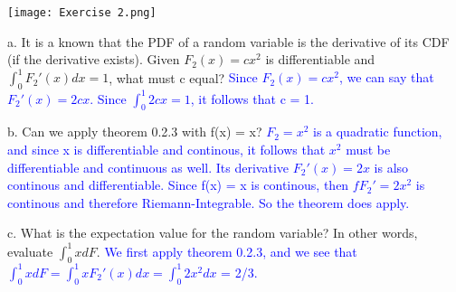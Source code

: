 \documentclass{report}
\begin{document}
\begin{center}
    \texttt{[image: Exercise 2.png]}
\end{center}
a. It is a known that the PDF of a random variable
is the derivative of its CDF (if the derivative exists). Given $F_2(x) = cx^2$ is differentiable 
and $\int_{0}^{1}F_2'(x)dx = 1$, what must c equal? \newline
\textcolor{blue}{Since $F_2(x) = cx^2$, we can say that $F_2'(x) = 2cx$. Since $\int_{0}^{1}2cx = 1$, it follows that c = 1.} \newline

b. Can we apply theorem 0.2.3 with f(x) = x? \newline
\textcolor{blue}{$F_2 = x^2$ is a quadratic function, and since x is differentiable and continous,
it follows that $x^2$ must be differentiable and continuous as well. Its derivative $F_2'(x) = 2x$ 
is also continous and differentiable. Since f(x) = x is continous, then $fF_2' = 2x^2$ is continous and 
therefore Riemann-Integrable. So the theorem does apply.} \newline

c. What is the expectation value for the random variable? In other words, 
evaluate $\int_{0}^{1}xdF.$ \newline
\textcolor{blue}{We first apply theorem 0.2.3, and we see that $\int_{0}^{1}xdF = \int_{0}^{1}xF_2'(x)dx = \int_{0}^{1}2x^2dx$ = 2/3.} \newline
\end{document}
